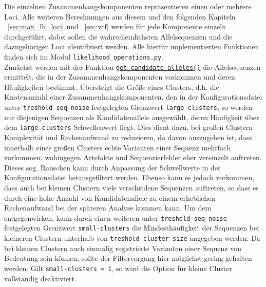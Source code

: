 Die einzelnen Zusammenhangskomponenten repräsentieren einen oder mehrere Loci. Alle weiteren Berechnungen aus diesem und den folgenden Kapiteln ~\ref{sec:max_lh_loci} und ~\ref{sec:vcf} werden für jede Komponente einzeln durchgeführt, dabei sollen die wahrscheinlichsten Allelsequenzen und die dazugehörigen Loci identifiziert werden. Alle hierfür implementierten Funktionen finden sich im Modul \lstinline|likelihood_operations.py|. \\

Zunächst werden mit der Funktion \hyperref[schritt6]{\lstinline|get_candidate_alleles()|\label{schritt6txt}} die Allelsequenzen ermittelt, die in der Zusammenhangskomponenten vorkommen und deren Häufigkeiten bestimmt. Übersteigt die Größe eines Clusters, d.h. die Knotenanzahl einer Zusammenhangskomponenten, den in der Konfigurationsdatei unter \lstinline|treshold-seq-noise| festgelegten Grenzwert \lstinline|large-clusters|, so werden nur diejenigen Sequenzen als Kandidatenallele ausgewählt, deren Häufigkeit über dem \lstinline|large-clusters| Schwellenwert liegt. Dies dient dazu, bei großen Clustern Komplexität und Rechenaufwand zu reduzieren, da davon auszugehen ist, dass innerhalb eines großen Clusters echte Varianten einer Sequenz mehrfach vorkommen, wohingegen Artefakte und Sequenzierfehler eher vereinzelt auftreten. Dieses sog. Rauschen kann durch Anpassung der Schwellwerte in der Konfigurationsdatei herausgefiltert werden. Ebenso kann es jedoch vorkommen, dass auch bei kleinen Clustern viele verschiedene Sequenzen auftreten, so dass es durch eine hohe Anzahl von Kandidatenallele zu einem erheblichen Rechenaufwand bei der späteren Analyse kommen kann. Um dem entgegenwirken, kann durch einen weiteren unter \lstinline|treshold-seq-noise| festgelegten Grenzwert \lstinline|small-clusters| die Mindesthäufigkeit der Sequenzen bei kleineren Clustern unterhalb von \lstinline|treshold-cluster-size| angegeben werden. Da bei kleinen Clustern auch einmalig registrierte Varianten einer Sequenz von Bedeutung sein können, sollte der Filtervorgang hier möglichst gering gehalten werden. Gilt \lstinline|small-clusters = 1|, so wird die Option für kleine Cluster vollständig deaktiviert. \\

